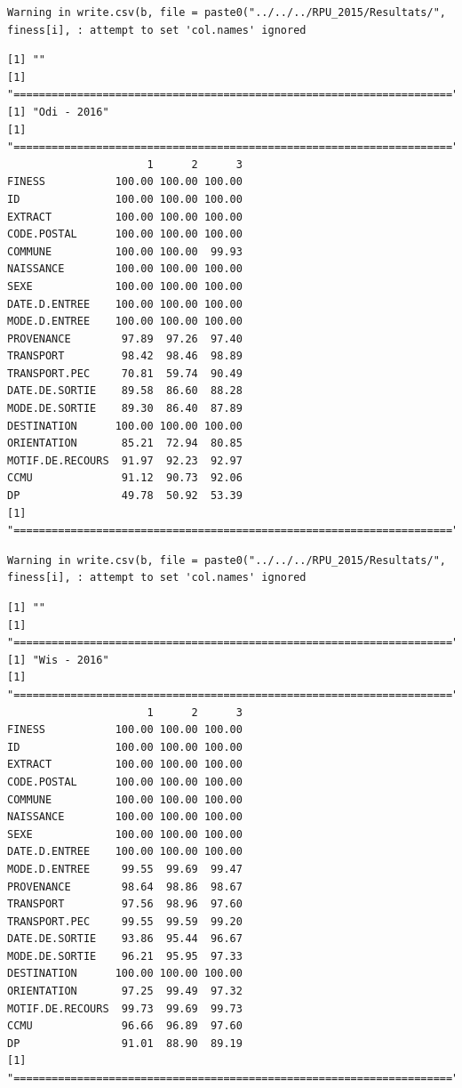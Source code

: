 \documentclass[]{article}
\begin{document}
\begin{verbatim}
Warning in write.csv(b, file = paste0("../../../RPU_2015/Resultats/",
finess[i], : attempt to set 'col.names' ignored
\end{verbatim}

\begin{verbatim}
[1] ""
[1] "====================================================================="
[1] "Odi - 2016"
[1] "====================================================================="
                      1      2      3
FINESS           100.00 100.00 100.00
ID               100.00 100.00 100.00
EXTRACT          100.00 100.00 100.00
CODE.POSTAL      100.00 100.00 100.00
COMMUNE          100.00 100.00  99.93
NAISSANCE        100.00 100.00 100.00
SEXE             100.00 100.00 100.00
DATE.D.ENTREE    100.00 100.00 100.00
MODE.D.ENTREE    100.00 100.00 100.00
PROVENANCE        97.89  97.26  97.40
TRANSPORT         98.42  98.46  98.89
TRANSPORT.PEC     70.81  59.74  90.49
DATE.DE.SORTIE    89.58  86.60  88.28
MODE.DE.SORTIE    89.30  86.40  87.89
DESTINATION      100.00 100.00 100.00
ORIENTATION       85.21  72.94  80.85
MOTIF.DE.RECOURS  91.97  92.23  92.97
CCMU              91.12  90.73  92.06
DP                49.78  50.92  53.39
[1] "====================================================================="
\end{verbatim}

\begin{verbatim}
Warning in write.csv(b, file = paste0("../../../RPU_2015/Resultats/",
finess[i], : attempt to set 'col.names' ignored
\end{verbatim}

\begin{verbatim}
[1] ""
[1] "====================================================================="
[1] "Wis - 2016"
[1] "====================================================================="
                      1      2      3
FINESS           100.00 100.00 100.00
ID               100.00 100.00 100.00
EXTRACT          100.00 100.00 100.00
CODE.POSTAL      100.00 100.00 100.00
COMMUNE          100.00 100.00 100.00
NAISSANCE        100.00 100.00 100.00
SEXE             100.00 100.00 100.00
DATE.D.ENTREE    100.00 100.00 100.00
MODE.D.ENTREE     99.55  99.69  99.47
PROVENANCE        98.64  98.86  98.67
TRANSPORT         97.56  98.96  97.60
TRANSPORT.PEC     99.55  99.59  99.20
DATE.DE.SORTIE    93.86  95.44  96.67
MODE.DE.SORTIE    96.21  95.95  97.33
DESTINATION      100.00 100.00 100.00
ORIENTATION       97.25  99.49  97.32
MOTIF.DE.RECOURS  99.73  99.69  99.73
CCMU              96.66  96.89  97.60
DP                91.01  88.90  89.19
[1] "====================================================================="
\end{verbatim}
\end{document}
